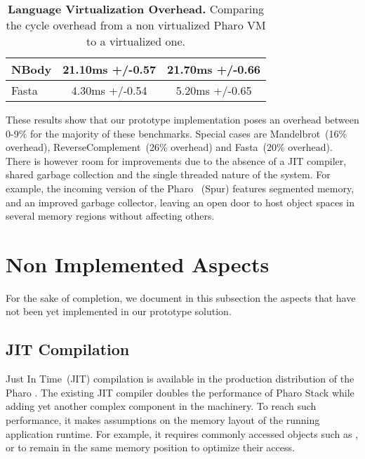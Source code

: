 \begin{table}[ht]
\begin{tabular}{lcc}
		NBody & 21.10ms +/-0.57 & 21.70ms +/-0.66 \\\midrule%
		Fasta & 4.30ms +/-0.54 & 5.20ms +/-0.65 \\\bottomrule%
 	\end{tabular}
	\vspace*{0.2cm}
 	\caption{\textbf{Language Virtualization Overhead.} Comparing the cycle overhead from a non virtualized Pharo VM to a virtualized one.\label{tb:benchmarks}}
 \end{table}

These results show that our prototype implementation poses an overhead between 0-9\% for the majority of these benchmarks. Special cases are Mandelbrot~(16\% overhead), ReverseComplement~(26\% overhead) and Fasta~(20\% overhead).
There is however room for improvements due to the absence of a JIT compiler, shared garbage collection and the single threaded nature of the system.
For example, the incoming version of the Pharo \VM~(Spur) features segmented memory, and an improved garbage collector, leaving an open door to host object spaces in several memory regions without affecting others. 



\section{Non Implemented Aspects} \label{sec:not_yet_implemented}
 
For the sake of completion, we document in this subsection the aspects that have not been yet implemented in our prototype solution.

\subsection{JIT Compilation}

Just In Time~(JIT) compilation is available in the production distribution of the Pharo \VM. The existing JIT compiler doubles the performance of Pharo Stack \VM while adding yet another complex component in the \VM machinery. To reach such performance, it makes assumptions on the memory layout of the running application runtime. For example, it requires commonly accessed objects such as ,  or  to remain in the same memory position to optimize their access.

